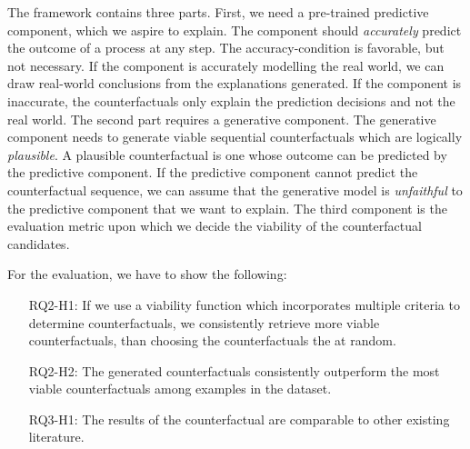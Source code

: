 \documentclass[./../../paper.tex]{subfiles}
\begin{document}
\noindent The framework contains three parts. First, we need a pre-trained predictive component, which we aspire to explain. The component should \emph{accurately} predict the outcome of a process at any step. The accuracy-condition is favorable, but not necessary. If the component is accurately modelling the real world, we can draw real-world conclusions from the explanations generated. If the component is inaccurate, the counterfactuals only explain the prediction decisions and not the real world. The second part requires a generative component. The generative component needs to generate viable sequential counterfactuals which are logically \emph{plausible}. A plausible counterfactual is one whose outcome can be  predicted by the predictive component. If the predictive component cannot predict the counterfactual sequence, we can assume that the generative model is \emph{unfaithful} to the predictive component that we want to explain. The third component is the evaluation metric upon which we decide the viability of the counterfactual candidates.

For the evaluation, we have to show the following:
\begin{itemize}
    \item[RQ2-H1:] If we use a viability function which incorporates multiple criteria to determine counterfactuals, we consistently retrieve more viable counterfactuals, than choosing the counterfactuals the at random.
    \item[RQ2-H2:] The generated counterfactuals consistently outperform the most viable counterfactuals among examples in the dataset.
    \item[RQ3-H1:] The results of the counterfactual are comparable to other existing literature.
\end{itemize}
\end{document}
